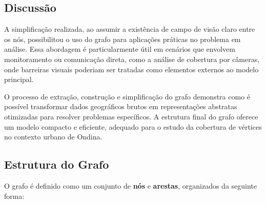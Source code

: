 \documentclass[12pt, a4paper]{report}
\begin{document}
\subsection{Discussão}

A simplificação realizada, ao assumir a existência de campo de visão claro entre os nós, possibilitou o uso do grafo para aplicações práticas no problema em análise. Essa abordagem é particularmente útil em cenários que envolvem monitoramento ou comunicação direta, como a análise de cobertura por câmeras, onde barreiras visuais poderiam ser tratadas como elementos externos ao modelo principal.

O processo de extração, construção e simplificação do grafo demonstra como é possível transformar dados geográficos brutos em representações abstratas otimizadas para resolver problemas específicos. A estrutura final do grafo oferece um modelo compacto e eficiente, adequado para o estudo da cobertura de vértices no contexto urbano de Ondina.

\subsection{Estrutura do Grafo}

O grafo é definido como um conjunto de \textbf{nós} e \textbf{arestas}, organizados da seguinte forma:
\end{document}
